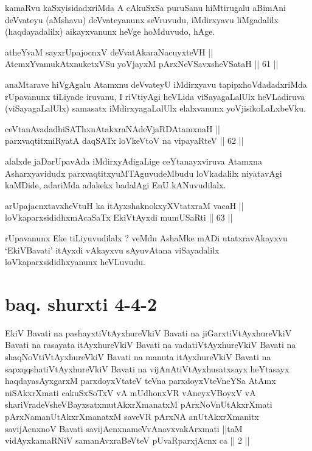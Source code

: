 \begin{artha}
kamaRvu kaSxyisidadxriMda A cAkuSxSa puruSanu hiMtirugalu aBimAni
deVvateyu (aMshavu) deVvateyanunx seVruvudu, iMdirxyavu liMgadalilx
(haqdayadalilx) aikayxvanunx heVge hoMduvudo, hAge.
\end{artha}

\begin{shl}
atheYvaM sayxrUpajocnxV deVvatAkaraNacuyxteVH ||  \\
AtemxYvamukAtxnuketxVSu yoVjayxM pArxNeVSavxsheVSataH \hfill || 61 ||  
\end{shl}

\begin{artha}
anaMtarave hiVgAgalu Atamxnu deVvateyU iMdirxyavu tapipxhoVdadadxriMda
rUpavanunx tiLiyade iruvanu, I riVtiyAgi heVLida viSayagaLalUlx
heVLadiruva (viSayagaLalUlx) samasatx iMdirxyagaLalUlx elalxvanunx
yoVjisikoLaLxbeVku.
\end{artha}

\begin{shl}
ceVtanAvadadhiSAThxnAtakxraNAdeVjaRDAtamxnaH || \\
parxvaqtitxniRyatA daqSATx loVkeV\s toV na vipayaRteV \hfill || 62 ||  
\end{shl}

\begin{artha}
alalxde jaDarUpavAda iMdirxyAdigaLige ceYtanayxviruva Atamxna
Asharxyavidudx parxvaqtitxyuMTAguvudeMbudu loVkadalilx niyatavAgi
kaMDide, adariMda adakekx badalAgi EnU kANuvudilalx.
\end{artha}

\begin{shl}
arUpajacnxtavxheVtuH ka itAyxshaknokxyXVtatxraM vacaH || \\
loVkaparxsididhxmAcaSaTx EkiVtAyxdi mumUSaRti \hfill || 63 ||  
\end{shl}

\begin{artha}
rUpavanunx Eke tiLiyuvudilalx ? veMdu AshaMke mADi utatxravAkayxvu
`EkiVBavati' itAyxdi vAkayxvu sAyuvAtana viSayadalilx
loVkaparxsididhxyanunx heVLuvudu.
\end{artha}

\section*{baq. shurxti 4-4-2}

\begin{shl}
EkiV Bavati na pashayxtiVtAyxhureVkiV Bavati na jiGarxtiVtAyxhureVkiV Bavati na rasayata itAyxhureVkiV Bavati na vadatiVtAyxhureVkiV Bavati na shaqNoVtiVtAyxhureVkiV Bavati na manuta itAyxhureVkiV Bavati na sapxqqshatiVtAyxhureVkiV Bavati na vijAnAtiVtAyxhusatxsayx heYtasayx haqdayasAyxgarxM parxdoyxVtateV teVna parxdoyxVteVneYSa AtAmx niSAkxrXmati cakuSxSoTxV vA mUdhonxVR vAneyxVBoyxV vA shariVradeVsheVBayxsatxmutAkxrXmanatxM pArxNoV\s nUtAkxrXmati pArxNamanUtAkxrXmanatxM saveVR pArxNA anUtAkxrXmanitx savijAcnxnoV Bavati savijAcnxnameVvAnavxvakArxmati ||taM vidAyxkamaRNiV samanAvxraBeVteV pUvaRparxjAcnx ca || 2 ||
\end{shl}


